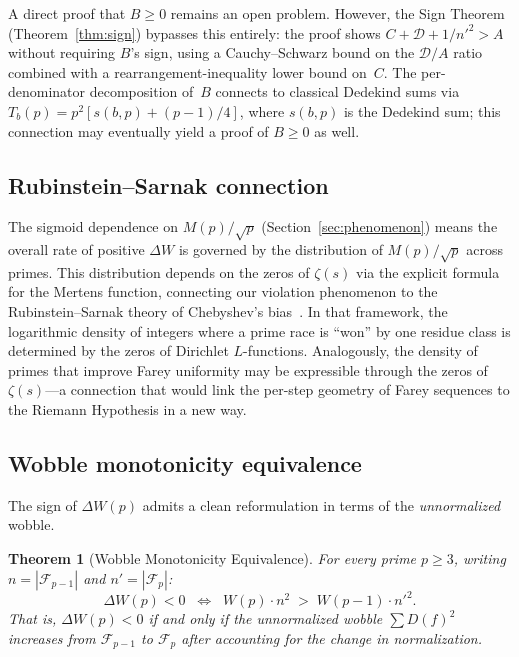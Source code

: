 \documentclass[11pt]{article}
\newtheorem{theorem}{Theorem}[section]
\theoremstyle{definition}
\newcommand{\F}{\mathcal{F}}
\begin{document}
\noindent A direct proof that $B \ge 0$ remains an open problem.
However, the Sign Theorem (Theorem~\ref{thm:sign}) bypasses
this entirely: the proof shows $C + \mathcal{D} + 1/{n'}^2 > A$
without requiring $B$'s sign, using a Cauchy--Schwarz bound on
the $\mathcal{D}/A$ ratio
combined with a rearrangement-inequality lower bound on~$C$.
The per-denominator decomposition of~$B$ connects to
classical Dedekind sums via $T_b(p) = p^2[s(b,p) + (p-1)/4]$,
where $s(b,p)$ is the Dedekind sum; this connection may
eventually yield a proof of $B \ge 0$ as well.

\subsection{Rubinstein--Sarnak connection}

The sigmoid dependence on $M(p)/\sqrt{p}$ (Section~\ref{sec:phenomenon})
means the overall rate of positive $\Delta W$ is governed by the distribution
of $M(p)/\sqrt{p}$ across primes.  This distribution depends on
the zeros of $\zeta(s)$ via the explicit formula for the Mertens
function, connecting our violation phenomenon to the
Rubinstein--Sarnak theory of Chebyshev's
bias~\cite{RubinsteinSarnak1994}.  In that framework, the
logarithmic density of integers where a prime race is ``won'' by
one residue class is determined by the zeros of Dirichlet
$L$-functions.  Analogously, the density of primes that
improve Farey uniformity may be expressible through the zeros
of~$\zeta(s)$---a connection that would link the per-step
geometry of Farey sequences to the Riemann Hypothesis in a
new way.


\subsection{Wobble monotonicity equivalence}

The sign of $\Delta W(p)$ admits a clean reformulation in terms
of the \emph{unnormalized} wobble.

\begin{theorem}[Wobble Monotonicity Equivalence]\label{thm:wobble-mono}
For every prime $p \ge 3$, writing $n = |\F_{p-1}|$ and $n' = |\F_p|$:
\begin{equation}\label{eq:wobble-mono}
  \Delta W(p) < 0
  \;\;\Longleftrightarrow\;\;
  W(p) \cdot n^2 \;>\; W(p-1) \cdot {n'}^2.
\end{equation}
That is, $\Delta W(p) < 0$ if and only if the \emph{unnormalized}
wobble $\sum D(f)^2$ increases from $\F_{p-1}$ to $\F_p$
after accounting for the change in normalization.
\end{theorem}
\end{document}
